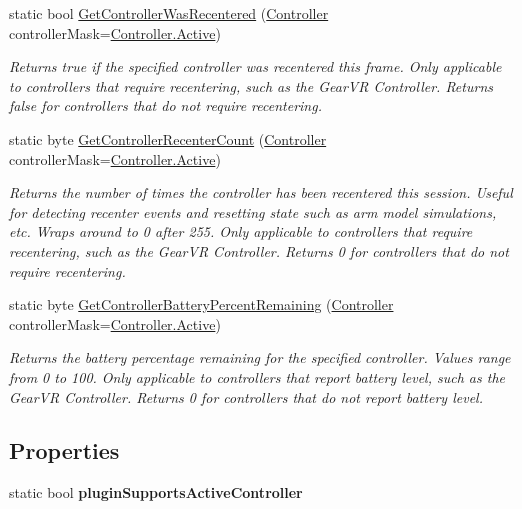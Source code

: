 \begin{DoxyCompactItemize}
static bool \mbox{\hyperlink{class_o_v_r_input_a07731a02d39af2a011d7579439dbeffd}{Get\+Controller\+Was\+Recentered}} (\mbox{\hyperlink{class_o_v_r_input_a5c86f9052a9cbb0b73779ff5704d60a8}{Controller}} controller\+Mask=\mbox{\hyperlink{class_o_v_r_input_a5c86f9052a9cbb0b73779ff5704d60a8a4d3d769b812b6faa6b76e1a8abaece2d}{Controller.\+Active}})
\begin{DoxyCompactList}\small\item\em Returns true if the specified controller was recentered this frame. Only applicable to controllers that require recentering, such as the Gear\+VR Controller. Returns false for controllers that do not require recentering. \end{DoxyCompactList}\item 
static byte \mbox{\hyperlink{class_o_v_r_input_ad77e66e45c218b833c6dc4a4d9b21f00}{Get\+Controller\+Recenter\+Count}} (\mbox{\hyperlink{class_o_v_r_input_a5c86f9052a9cbb0b73779ff5704d60a8}{Controller}} controller\+Mask=\mbox{\hyperlink{class_o_v_r_input_a5c86f9052a9cbb0b73779ff5704d60a8a4d3d769b812b6faa6b76e1a8abaece2d}{Controller.\+Active}})
\begin{DoxyCompactList}\small\item\em Returns the number of times the controller has been recentered this session. Useful for detecting recenter events and resetting state such as arm model simulations, etc. Wraps around to 0 after 255. Only applicable to controllers that require recentering, such as the Gear\+VR Controller. Returns 0 for controllers that do not require recentering. \end{DoxyCompactList}\item 
static byte \mbox{\hyperlink{class_o_v_r_input_abed7e5330bf1ef803f06728c48e2aa14}{Get\+Controller\+Battery\+Percent\+Remaining}} (\mbox{\hyperlink{class_o_v_r_input_a5c86f9052a9cbb0b73779ff5704d60a8}{Controller}} controller\+Mask=\mbox{\hyperlink{class_o_v_r_input_a5c86f9052a9cbb0b73779ff5704d60a8a4d3d769b812b6faa6b76e1a8abaece2d}{Controller.\+Active}})
\begin{DoxyCompactList}\small\item\em Returns the battery percentage remaining for the specified controller. Values range from 0 to 100. Only applicable to controllers that report battery level, such as the Gear\+VR Controller. Returns 0 for controllers that do not report battery level. \end{DoxyCompactList}\end{DoxyCompactItemize}
\subsection*{Properties}
\begin{DoxyCompactItemize}
\item 
\mbox{\label{class_o_v_r_input_a0c5955f378159342087b3e7adc6d6f75}} 
static bool {\bfseries plugin\+Supports\+Active\+Controller}
\end{DoxyCompactItemize}

